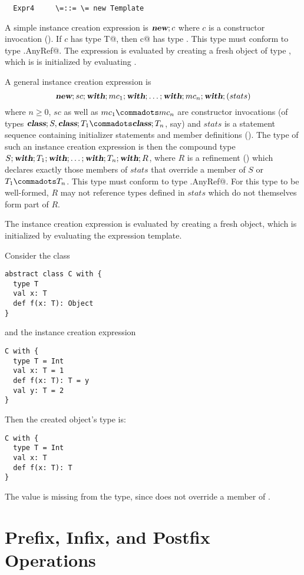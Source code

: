 \documentclass[11pt]{report}
\begin{document}
\syntax\begin{verbatim}
  Expr4     \=::= \= new Template
\end{verbatim}

A simple instance creation expression is $\mbox{\sl\bfseries new};c$ where $c$ is a
constructor invocation ().  If $c$ has type
\verb@class T@, then \verb@new c@ has type \verb@T@.
This type must conform to
type \verb@scala.AnyRef@.
The expression
is evaluated by creating a fresh object of type \verb@T@, which is is
initialized by evaluating \verb@c@.

A general instance creation expression is
$$\mbox{\sl\bfseries new};sc;\mbox{\sl\bfseries with};mc_1;\mbox{\sl\bfseries with};\ldots;\mbox{\sl\bfseries with};mc_n;\mbox{\sl\bfseries with};(stats)$$ where $n \geq
0$, $sc$ as well as $mc_1 \commadots mc_n$ are constructor invocations
(of types $\CLASS;S, \CLASS;T_1 \commadots \CLASS;T_n$, say) and
$stats$ is a statement sequence containing initializer statements
and member definitions (). The type of such an
instance creation expression is then the compound type
$S;\mbox{\sl\bfseries with};T_1;\mbox{\sl\bfseries with};\ldots;\mbox{\sl\bfseries with};T_n;\mbox{\sl\bfseries with};R$, where $R$ is a
refinement () which declares exactly those
members of $stats$ that override a member of $S$ or $T_1 \commadots
T_n$. This type must conform to
type \verb@scala.AnyRef@.
For this type to be well-formed, $R$ may not reference types
defined in $stats$ which do not themselves form part of $R$.

The instance creation expression is evaluated by creating a fresh
object, which is initialized by evaluating the expression template.

\example Consider the class
\begin{verbatim}
abstract class C with {
  type T
  val x: T
  def f(x: T): Object
}
\end{verbatim}
and the instance creation expression
\begin{verbatim}
C with {
  type T = Int
  val x: T = 1
  def f(x: T): T = y
  val y: T = 2
}
\end{verbatim}
Then the created object's type is:
\begin{verbatim}
C with {
  type T = Int
  val x: T
  def f(x: T): T
}
\end{verbatim}
The value \verb@y@ is missing from the type, since \verb@y@ does not
override a member of \verb@C@.

\section{Prefix, Infix, and Postfix Operations}
\label{sec:infix-operations}
\end{document}
